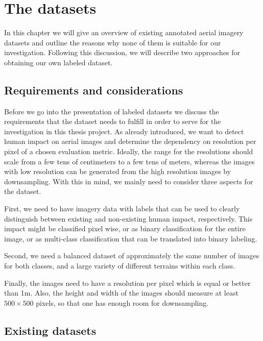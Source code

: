 
\chapter{The datasets} %

\label{Chapter2} %


In this chapter we will give an overview of existing annotated aerial imagery datasets and outline the reasons why none of them is suitable for our investigation. Following this discussion, we will describe two approaches for obtaining our own labeled dataset.

\section{Requirements and considerations}

Before we go into the presentation of labeled datasets we discuss the requirements that the dataset needs to fulfill in order to serve for the investigation in this thesis project. As already introduced, we want to detect human impact on aerial images and determine the dependency on resolution per pixel of a chosen evaluation metric. Ideally, the range for the resolutions should scale from a few tens of centimeters to a few tens of meters, whereas the images with low resolution can be generated from the high resolution images by downsampling. With this in mind, we mainly need to consider three aspects for the dataset.

First, we need to have imagery data with labels that can be used to clearly distinguish between existing and non-existing human impact, respectively. This impact might be classified pixel wise, or as binary classification for the entire image, or as multi-class classification that can be translated into binary labeling. 

Second, we need a balanced dataset of approximately the same number of images for both classes, and a large variety of different terrains within each class. 

Finally, the images need to have a resolution per pixel which is equal or better than 1m. Also, the height and width of the images should measure at least $500\times500$ pixels, so that one has enough room for downsampling. 

\section{Existing datasets}

